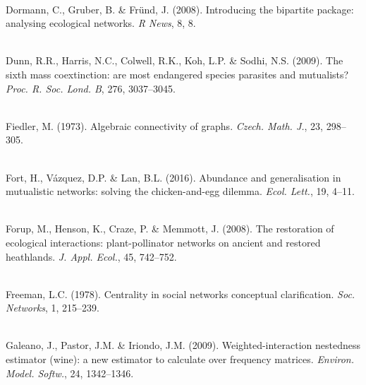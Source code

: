 \documentclass[12pt]{article}
\begin{document}
\begin{thebibliography}{67}
\hspace{0em}\\Dormann, C., Gruber, B. \& Fr{\"u}nd, J. (2008).
\newblock Introducing the bipartite package: analysing ecological networks.
\newblock \emph{R News}, 8, 8.

\hspace{0em}\\Dunn, R.R., Harris, N.C., Colwell, R.K., Koh, L.P. \& Sodhi, N.S.
  (2009).
\newblock The sixth mass coextinction: are most endangered species parasites
  and mutualists?
\newblock \emph{Proc. R. Soc. Lond. B}, 276, 3037--3045.

\hspace{0em}\\Fiedler, M. (1973).
\newblock Algebraic connectivity of graphs.
\newblock \emph{Czech. Math. J.}, 23, 298--305.

\hspace{0em}\\Fort, H., V{\'a}zquez, D.P. \& Lan, B.L. (2016).
\newblock Abundance and generalisation in mutualistic networks: solving the
  chicken-and-egg dilemma.
\newblock \emph{Ecol. Lett.}, 19, 4--11.

\hspace{0em}\\Forup, M., Henson, K., Craze, P. \& Memmott, J. (2008).
\newblock The restoration of ecological interactions: plant-pollinator networks
  on ancient and restored heathlands.
\newblock \emph{J. Appl. Ecol.}, 45, 742--752.

\hspace{0em}\\Freeman, L.C. (1978).
\newblock Centrality in social networks conceptual clarification.
\newblock \emph{Soc. Networks}, 1, 215--239.

\hspace{0em}\\Galeano, J., Pastor, J.M. \& Iriondo, J.M. (2009).
\newblock Weighted-interaction nestedness estimator (wine): a new estimator to
  calculate over frequency matrices.
\newblock \emph{Environ. Model. Softw.}, 24, 1342--1346.


\end{thebibliography}
\end{document}
